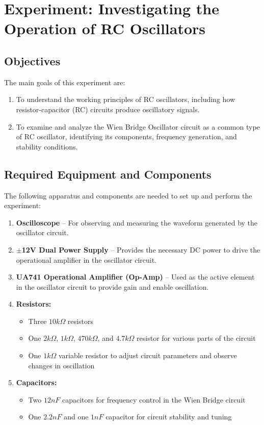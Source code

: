 \documentclass[12pt,a4paper]{article}
\begin{document}
    \tableofcontents
    \newpage

    \listoffigures
    \newpage




    \section{Experiment: Investigating the Operation of RC Oscillators}

    \subsection{Objectives}
    The main goals of this experiment are:
    \begin{enumerate}
        \item To understand the working principles of RC oscillators, including how resistor-capacitor (RC) circuits produce oscillatory signals.
        \item To examine and analyze the Wien Bridge Oscillator circuit as a common type of RC oscillator, identifying its components, frequency generation, and stability conditions.
    \end{enumerate}
    
    \subsection{Required Equipment and Components}
    The following apparatus and components are needed to set up and perform the experiment:
    \begin{enumerate}
        \item \textbf{Oscilloscope} – For observing and measuring the waveform generated by the oscillator circuit.
        \item \textbf{$\pm$12V Dual Power Supply} – Provides the necessary DC power to drive the operational amplifier in the oscillator circuit.
        \item \textbf{UA741 Operational Amplifier (Op-Amp)} – Used as the active element in the oscillator circuit to provide gain and enable oscillation.
        \item \textbf{Resistors:}
            \begin{itemize}
                \item Three $10k \Omega$ resistors
                \item One $2k \Omega$, $1k \Omega$, $470k \Omega$, and $4.7k \Omega$ resistor for various parts of the circuit
                \item One $1k \Omega$ variable resistor to adjust circuit parameters and observe changes in oscillation
            \end{itemize}
        \item \textbf{Capacitors:}
            \begin{itemize}
                \item Two $12nF$ capacitors for frequency control in the Wien Bridge circuit
                \item One $2.2nF$ and one $1nF$ capacitor for circuit stability and tuning
            \end{itemize}
    \end{enumerate}
\end{document}
